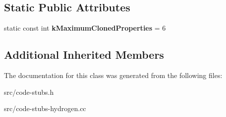 \subsection*{Static Public Attributes}
\begin{DoxyCompactItemize}
\item 
\hypertarget{classv8_1_1internal_1_1_fast_clone_shallow_object_stub_aef6426a2b2b460eac45ba180dbef7f9b}{}static const int {\bfseries k\+Maximum\+Cloned\+Properties} = 6\label{classv8_1_1internal_1_1_fast_clone_shallow_object_stub_aef6426a2b2b460eac45ba180dbef7f9b}

\end{DoxyCompactItemize}
\subsection*{Additional Inherited Members}


The documentation for this class was generated from the following files\+:\begin{DoxyCompactItemize}
\item 
src/code-\/stubs.\+h\item 
src/code-\/stubs-\/hydrogen.\+cc\end{DoxyCompactItemize}
